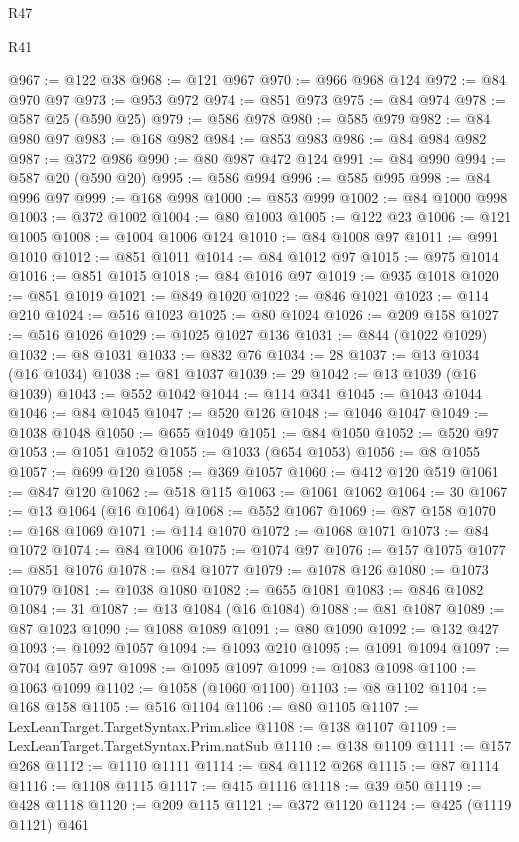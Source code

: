 \begin{lexlean}{R47}
\begin{lexlean}{R41}
\begin{coremodule}
{{{{{{{{{{{{{{{{{{{{{{{{{{{{{{{{{{{{{{{{{{{{{{{{{{{{{{{{{{{{{{{{{{{{{{{{{{{{{{{{{{{{{{{@967 := @122 @38
@968 := @121 @967
@970 := @966 @968 @124
@972 := @84 @970 @97
@973 := @953 @972
@974 := @851 @973
@975 := @84 @974
@978 := @587 @25 (@590 @25)
@979 := @586 @978
@980 := @585 @979
@982 := @84 @980 @97
@983 := @168 @982
@984 := @853 @983
@986 := @84 @984 @982
@987 := @372 @986
@990 := @80 @987 @472 @124
@991 := @84 @990
@994 := @587 @20 (@590 @20)
@995 := @586 @994
@996 := @585 @995
@998 := @84 @996 @97
@999 := @168 @998
@1000 := @853 @999
@1002 := @84 @1000 @998
@1003 := @372 @1002
@1004 := @80 @1003
@1005 := @122 @23
@1006 := @121 @1005
@1008 := @1004 @1006 @124
@1010 := @84 @1008 @97
@1011 := @991 @1010
@1012 := @851 @1011
@1014 := @84 @1012 @97
@1015 := @975 @1014
@1016 := @851 @1015
@1018 := @84 @1016 @97
@1019 := @935 @1018
@1020 := @851 @1019
@1021 := @849 @1020
@1022 := @846 @1021
@1023 := @114 @210
@1024 := @516 @1023
@1025 := @80 @1024
@1026 := @209 @158
@1027 := @516 @1026
@1029 := @1025 @1027 @136
@1031 := @844 (@1022 @1029)
@1032 := @8 @1031
@1033 := @832 @76
@1034 := 28
@1037 := @13 @1034 (@16 @1034)
@1038 := @81 @1037
@1039 := 29
@1042 := @13 @1039 (@16 @1039)
@1043 := @552 @1042
@1044 := @114 @341
@1045 := @1043 @1044
@1046 := @84 @1045
@1047 := @520 @126
@1048 := @1046 @1047
@1049 := @1038 @1048
@1050 := @655 @1049
@1051 := @84 @1050
@1052 := @520 @97
@1053 := @1051 @1052
@1055 := @1033 (@654 @1053)
@1056 := @8 @1055
@1057 := @699 @120
@1058 := @369 @1057
@1060 := @412 @120 @519
@1061 := @847 @120
@1062 := @518 @115
@1063 := @1061 @1062
@1064 := 30
@1067 := @13 @1064 (@16 @1064)
@1068 := @552 @1067
@1069 := @87 @158
@1070 := @168 @1069
@1071 := @114 @1070
@1072 := @1068 @1071
@1073 := @84 @1072
@1074 := @84 @1006
@1075 := @1074 @97
@1076 := @157 @1075
@1077 := @851 @1076
@1078 := @84 @1077
@1079 := @1078 @126
@1080 := @1073 @1079
@1081 := @1038 @1080
@1082 := @655 @1081
@1083 := @846 @1082
@1084 := 31
@1087 := @13 @1084 (@16 @1084)
@1088 := @81 @1087
@1089 := @87 @1023
@1090 := @1088 @1089
@1091 := @80 @1090
@1092 := @132 @427
@1093 := @1092 @1057
@1094 := @1093 @210
@1095 := @1091 @1094
@1097 := @704 @1057 @97
@1098 := @1095 @1097
@1099 := @1083 @1098
@1100 := @1063 @1099
@1102 := @1058 (@1060 @1100)
@1103 := @8 @1102
@1104 := @168 @158
@1105 := @516 @1104
@1106 := @80 @1105
@1107 := LexLeanTarget.TargetSyntax.Prim.slice
@1108 := @138 @1107
@1109 := LexLeanTarget.TargetSyntax.Prim.natSub
@1110 := @138 @1109
@1111 := @157 @268
@1112 := @1110 @1111
@1114 := @84 @1112 @268
@1115 := @87 @1114
@1116 := @1108 @1115
@1117 := @415 @1116
@1118 := @39 @50
@1119 := @428 @1118
@1120 := @209 @115
@1121 := @372 @1120
@1124 := @425 (@1119 @1121) @461
}}}}}}}}}}}}}}}}}}}}}}}}}}}}}}}}}}}}}}}}}}}}}}}}}}}}}}}}}}}}}}}}}}}}}}}}}}}}}}}}}}}}}}}
\end{coremodule}
\end{lexlean}
\end{lexlean}
